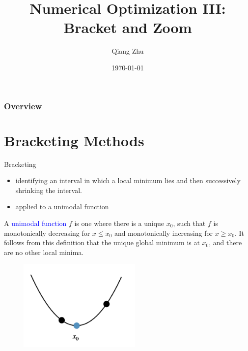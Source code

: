 \documentclass{beamer}
\title[Optimization]{Numerical Optimization III: Bracket and Zoom} %
\author{Qiang Zhu} %
\institute[University of Nevada Las Vegas] %
{
University of Nevada Las Vegas\\ %
\medskip
}
\date{\today} %
\begin{document}
\begin{frame}
\titlepage %
\end{frame}

\begin{frame}
\frametitle{Overview} %
\tableofcontents %
\end{frame}



\section{Bracketing Methods}
\begin{frame}{Bracketing}
\begin{itemize}
    \item identifying an interval in which a local minimum lies and then successively shrinking the interval.
    \item applied to a unimodal function
\end{itemize}
A \textcolor{blue}{unimodal function} $f$ is one where there is a unique $x_0$, such that $f$ is monotonically decreasing for $x \leq x_0$ and monotonically increasing for $x \geq x_0$. It follows from this definition that the unique global minimum is at $x_0$, and there are no other local minima.
\begin{figure}
\centering
\includegraphics[width=60mm]{Figs/unimodal.jpeg}
\end{figure}
\end{frame}
\end{document}
